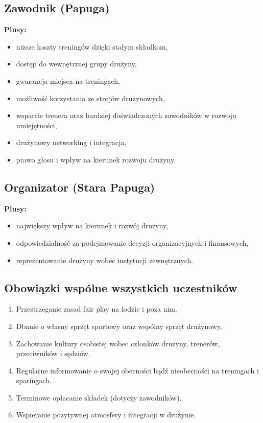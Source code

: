 \documentclass[12pt,a4paper]{article}
\begin{document}
\subsection{Zawodnik (Papuga)}
\textbf{Plusy:}
\begin{itemize}
    \item niższe koszty treningów dzięki stałym składkom,
    \item dostęp do wewnętrznej grupy drużyny,
    \item gwarancja miejsca na treningach,
    \item możliwość korzystania ze strojów drużynowych,
    \item wsparcie trenera oraz bardziej doświadczonych zawodników w rozwoju umiejętności,
    \item drużynowy networking i integracja,
    \item prawo głosu i wpływ na kierunek rozwoju drużyny.
\end{itemize}

\subsection{Organizator (Stara Papuga)}
\textbf{Plusy:}
\begin{itemize}
    \item największy wpływ na kierunek i rozwój drużyny,
    \item odpowiedzialność za podejmowanie decyzji organizacyjnych i finansowych,
    \item reprezentowanie drużyny wobec instytucji zewnętrznych.
\end{itemize}

\subsection{Obowiązki wspólne wszystkich uczestników}
\begin{enumerate}
    \item Przestrzeganie zasad fair play na lodzie i poza nim.
    \item Dbanie o własny sprzęt sportowy oraz wspólny sprzęt drużynowy.
    \item Zachowanie kultury osobistej wobec członków drużyny, trenerów, przeciwników i sędziów.
    \item Regularne informowanie o swojej obecności bądź nieobecności na treningach i sparingach.
    \item Terminowe opłacanie składek (dotyczy zawodników).
    \item Wspieranie pozytywnej atmosfery i integracji w drużynie.
\end{enumerate}
\end{document}
